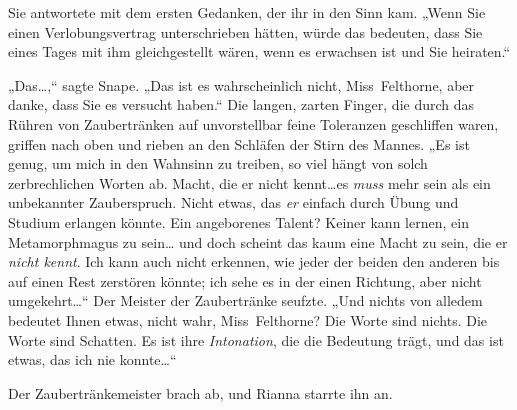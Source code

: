 Sie antwortete mit dem ersten Gedanken, der ihr in den Sinn kam. „Wenn Sie einen Verlobungsvertrag unterschrieben hätten, würde das bedeuten, dass Sie eines Tages mit ihm gleichgestellt wären, wenn es erwachsen ist und Sie heiraten.“

„Das…,“ sagte Snape. „Das ist es wahrscheinlich nicht, Miss~Felthorne, aber danke, dass Sie es versucht haben.“ Die langen, zarten Finger, die durch das Rühren von Zaubertränken auf unvorstellbar feine Toleranzen geschliffen waren, griffen nach oben und rieben an den Schläfen der Stirn des Mannes. „Es ist genug, um mich in den Wahnsinn zu treiben, so viel hängt von solch zerbrechlichen Worten ab. Macht, die er nicht kennt…es \emph{muss} mehr sein als ein unbekannter Zauberspruch. Nicht etwas, das \emph{er} einfach durch Übung und Studium erlangen könnte. Ein angeborenes Talent? Keiner kann lernen, ein Metamorphmagus zu sein… und doch scheint das kaum eine Macht zu sein, die er \emph{nicht kennt}. Ich kann auch nicht erkennen, wie jeder der beiden den anderen bis auf einen Rest zerstören könnte; ich sehe es in der einen Richtung, aber nicht umgekehrt…“ Der Meister der Zaubertränke seufzte. „Und nichts von alledem bedeutet Ihnen etwas, nicht wahr, Miss~Felthorne? Die Worte sind nichts. Die Worte sind Schatten. Es ist ihre \emph{Intonation}, die die Bedeutung trägt, und das ist etwas, das ich nie konnte…“

Der Zaubertränkemeister brach ab, und Rianna starrte ihn an.

